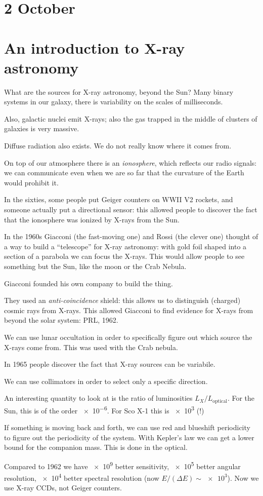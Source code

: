 \documentclass[main.tex]{subfiles}
\begin{document}
\section*{2 October}

\section{An introduction to X-ray astronomy}

What are the sources for X-ray astronomy, beyond the Sun? Many binary systems in our galaxy, there is variability on the scales of milliseconds.

Also, galactic nuclei emit X-rays; also the gas trapped in the middle of clusters of galaxies is very massive.

Diffuse radiation also exists. We do not really know where it comes from.

On top of our atmosphere there is an \emph{ionosphere}, which reflects our radio signals: we can communicate even when we are so far that the curvature of the Earth would prohibit it.

In the sixties, some people put Geiger counters on WWII V2 rockets, and someone actually put a directional sensor: this allowed people to discover the fact that the ionosphere was ionized by X-rays from the Sun.

In the 1960s Giacconi (the fast-moving one) and Rossi (the clever one) thought of a way to build a ``telescope'' for X-ray astronomy: with gold foil shaped into a section of a parabola we can focus the X-rays.
This would allow people to see something but the Sun, like the moon or the Crab Nebula.

Giacconi founded his own company to build the thing.

They used an \emph{anti-coincidence} shield: this allows us to distinguish (charged) cosmic rays from X-rays.
This allowed Giacconi to find evidence for X-rays from beyond the solar system: PRL, 1962.

We can use lunar occultation in order to specifically figure out which source the X-rays come from. This was used with the Crab nebula.

In 1965 people discover the fact that X-ray sources can  be variabile.

We can use collimators in order to select only a specific direction.

An interesting quantity to look at is the ratio of luminosities \(L_X / L_{\text{optical}}\). For the Sun, this is of the order \num{e-6}. For Sco X-1 this is \num{e3} (!)

If something is moving back and forth, we can use red and blueshift periodicity to figure out the periodicity of the system.
With Kepler's law we can get a lower bound for the companion mass.
This is done in the optical.

Compared to 1962 we have \num{e9} better sensitivity, \num{e5} better angular resolution, \num{e4} better spectral resolution (now \(E / (\Delta E ) \sim \num{e3} \)). Now we use X-ray CCDs, not Geiger counters.
\end{document}
